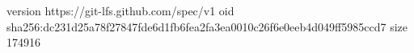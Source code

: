 version https://git-lfs.github.com/spec/v1
oid sha256:dc231d25a78f27847fde6d1fb6fea2fa3ea0010c26f6e0eeb4d049ff5985ccd7
size 174916
